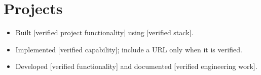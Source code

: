 \section{Projects}
\begin{itemize}
  \item Built [verified project functionality] using [verified stack].
  \item Implemented [verified capability]; include a URL only when it is verified.
\end{itemize}

\begin{itemize}
  \item Developed [verified functionality] and documented [verified engineering work].
\end{itemize}
